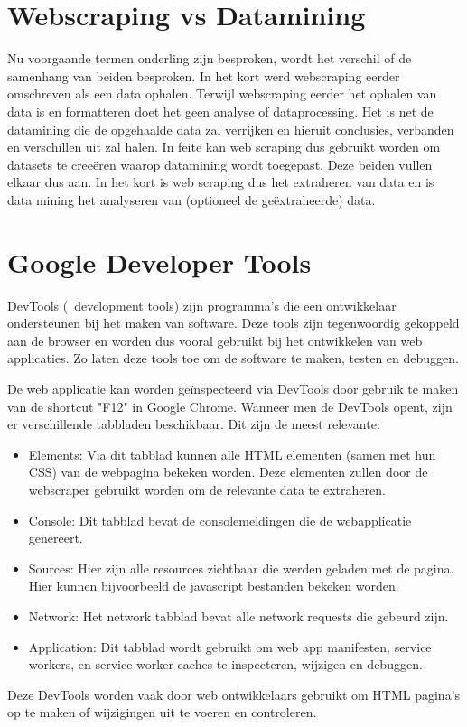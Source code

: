 \section{Webscraping vs Datamining}

Nu voorgaande termen onderling zijn besproken, wordt het verschil of de samenhang van beiden besproken. In het kort werd webscraping eerder omschreven als een data ophalen. Terwijl webscraping eerder het ophalen van data is en formatteren doet het geen analyse of dataprocessing. Het is net de datamining die de opgehaalde data zal verrijken en hieruit conclusies, verbanden en verschillen uit zal halen. In feite kan web scraping dus gebruikt worden om datasets te creeëren waarop datamining wordt toegepast. Deze beiden vullen elkaar dus aan. In het kort is web scraping dus het extraheren van data en is data mining het analyseren van (optioneel de geëxtraheerde) data.

\section{Google Developer Tools}
DevTools (~development tools) zijn programma's die een ontwikkelaar ondersteunen bij het maken van software. Deze tools zijn tegenwoordig gekoppeld aan de browser en worden dus vooral gebruikt bij het ontwikkelen van web applicaties. 
Zo laten deze tools toe om de software te maken, testen en debuggen.

De web applicatie kan worden geïnspecteerd via DevTools door gebruik te maken van de shortcut "F12" in Google Chrome. Wanneer men de DevTools opent, zijn er verschillende tabbladen beschikbaar. Dit zijn de meest relevante:
\begin{itemize}
	\item Elements: 
		Via dit tabblad kunnen alle HTML elementen (samen met hun CSS) van de webpagina bekeken worden. Deze elementen zullen door de webscraper gebruikt worden om de relevante data te extraheren.
	\item Console:
		Dit tabblad bevat de consolemeldingen die de webapplicatie genereert.
 	\item Sources:
		Hier zijn alle resources zichtbaar die werden geladen met de pagina. Hier kunnen bijvoorbeeld de javascript bestanden bekeken worden.
	\item Network:
		Het network tabblad bevat alle network requests die gebeurd zijn.
	\item Application: 
		Dit tabblad wordt gebruikt om web app manifesten, service workers, en service worker caches te inspecteren, wijzigen en debuggen.
\end{itemize}
Deze DevTools worden vaak door web ontwikkelaars gebruikt om HTML pagina's op te maken of wijzigingen uit te voeren en controleren.


